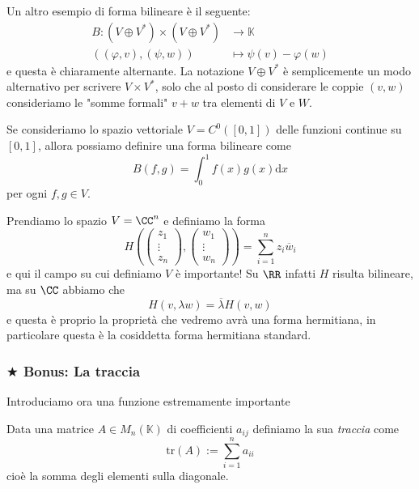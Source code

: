 \documentclass[11pt]{scrartcl}
\newcommand{\dif}{\text{d}}
\newcommand{\tr}[1]{\text{tr}\!\left(#1\right)}
\newcommand{\KK}{\mathbb{K}}
\begin{document}
	\begin{example}[Duale]
		Un altro esempio di forma bilineare è il seguente:
		\begin{align*}
			B:\left(V\oplus V^*\right)\times \left(V\oplus V^*\right) & \to \KK \\
			\left(\left(\varphi,v\right),\left(\psi,w\right)\right) & \mapsto \psi(v)-\varphi(w)
		\end{align*}
		e questa è chiaramente alternante. La notazione $V\oplus V^*$ è semplicemente un modo alternativo per scrivere $V\times V^*$, solo che al posto di considerare le coppie $(v,w)$ consideriamo le "somme formali" $v+w$ tra elementi di $V$ e $W$.
	\end{example}
	\begin{example}
		Se consideriamo lo spazio vettoriale $V=C^0\left([0,1]\right)$ delle funzioni continue su $[0,1]$, allora possiamo definire una forma bilineare come
		$$B(f,g)=\int_0^1 f(x)g(x)\dif x$$
		per ogni $f,g\in V$.
	\end{example}
	\begin{example}
		Prendiamo lo spazio $V=\CC^n$ e definiamo la forma
		$$H
		\left(\begin{pmatrix}
			z_1 \\
			\vdots \\
			z_n 
		\end{pmatrix}
		,
		\begin{pmatrix}
			w_1 \\
			\vdots \\
			w_n 
		\end{pmatrix}\right)=\sum_{i=1}^{n}z_i\overline{w}_i
		$$ 
		e qui il campo su cui definiamo $V$ è importante! Su $\RR$ infatti $H$ risulta bilineare, ma su $\CC$ abbiamo che
		$$H(v,\lambda w)=\overline{\lambda}H(v,w)$$
		e questa è proprio la proprietà che vedremo avrà una forma hermitiana, in particolare questa è la cosiddetta forma hermitiana standard.
	\end{example}
	
	\subsubsection{$\bigstar$ Bonus: La traccia}
	
	Introduciamo ora una funzione estremamente importante
	
	\begin{definition}[Traccia]
		Data una matrice $A\in M_n(\KK)$ di coefficienti $a_{ij}$ definiamo la sua \textit{traccia} come
		$$\tr A:=\sum_{i=1}^{n}a_{ii}$$
		cioè la somma degli elementi sulla diagonale.
	\end{definition}
	
\end{document}
